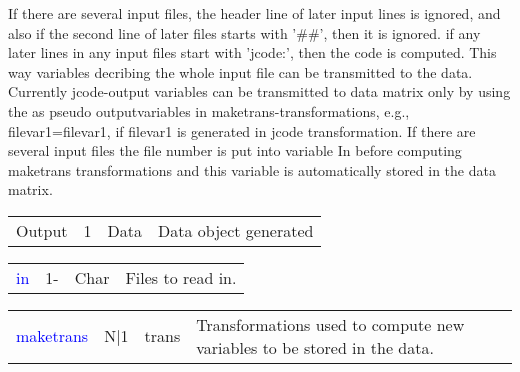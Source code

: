 If there are several input files, the header line of later input lines is ignored, and
 also if the second line of later files starts with '\#\#', then it is ignored.
 if any later lines in any input files start with 'jcode:', then the code is computed.
This way variables decribing the whole input file can be transmitted to the data.
 Currently jcode-output variables can be transmitted to data matrix only by using the as pseudo
outputvariables in maketrans-transformations, e.g., filevar1=filevar1, if
filevar1 is generated in jcode transformation.
 If there are several input files the file number is put into variable In before computing maketrans transformations
 and this variable is automatically stored in the data matrix.
\begin{table}[H]
\begin{tabular}{ m{}  m{}m{}p{}}
Output&1&Data& Data object generated
\\ \cline{1-4}
\end{tabular}
\end{table}
\vspace{-1.51em}
\begin{table}[H]
\begin{tabular}{ m{}  m{}m{}p{}}
\textcolor{blue}{in}&1-&Char&Files to read in.
\\ \cline{1-4}
\end{tabular}
\end{table}
\vspace{-1.51em}
\begin{table}[H]
\begin{tabular}{ m{}  m{}m{}p{}}
\textcolor{blue}{maketrans}&N|1&trans& Transformations used to compute new variables to be stored
 in the data.
\\ \cline{1-4}
\end{tabular}
\end{table}

